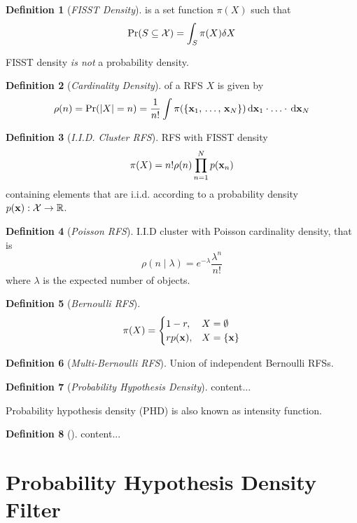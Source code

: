 \documentclass[a4paper,10pt]{scrreprt}
\theoremstyle{theorem}
\theoremstyle{definition}
\newtheorem{defn}{Definition}
\begin{document}
\begin{defn}[\emph{FISST Density}]
	 is a set function \( \pi(X) \) such that 
	\begin{equation}\label{eq:fiist_density}
		\mathrm{Pr}(S \subseteq \mathcal{X}) = \int_S \pi(X) \dsx[X]
	\end{equation}
\end{defn}
FISST density \emph{is not} a probability density.

\begin{defn}[\emph{Cardinality Density}]
	of a RFS \( X \) is given by
	\begin{equation}\label{key}
		\rho(n) = \Pr(|X|=n) = \frac{1}{n!}\int \pi(\Bqty{\stVar_1,\, \ldots,\, \stVar_N}) \dx[\stVar_1]\cdot\ldots\cdot\dx[\stVar_N]
	\end{equation}
\end{defn}

\begin{defn}[\emph{I.I.D. Cluster RFS}]
	RFS with FISST density
	\begin{equation}\label{key}
		\pi(X) = n! \rho(n) \prod_{n=1}^{N} p(\stVar_n)
	\end{equation}
	containing elements that are i.i.d. according to a probability density \( p(\stVar): \stSp\to\R \).
\end{defn}

\begin{defn}[\emph{Poisson RFS}]
	I.I.D cluster with Poisson cardinality density, that is
	\begin{equation}\label{key}
		\rho(n \mid \lambda) = e^{-\lambda} \frac{\lambda^n}{n!}
	\end{equation}
	where \( \lambda \) is the expected number of objects.
\end{defn}

\begin{defn}[\emph{Bernoulli RFS}]
\begin{equation}\label{eq:bernoulli_rfs}
	\pi(X) = 
	\begin{cases}
	1 - r, 			& X = \emptyset \\
	r p(\stVar), 	& X = \Bqty{\stVar}
	\end{cases}
\end{equation}
\end{defn}

\begin{defn}[\emph{Multi-Bernoulli RFS}]
	Union of independent Bernoulli RFSs.
\end{defn}

\begin{defn}[\emph{Probability Hypothesis Density}]
	content...
\end{defn}
Probability hypothesis density (PHD) is also known as intensity function.

\begin{defn}[]
	content...
\end{defn}



\section{Probability Hypothesis Density Filter}





\end{document}
